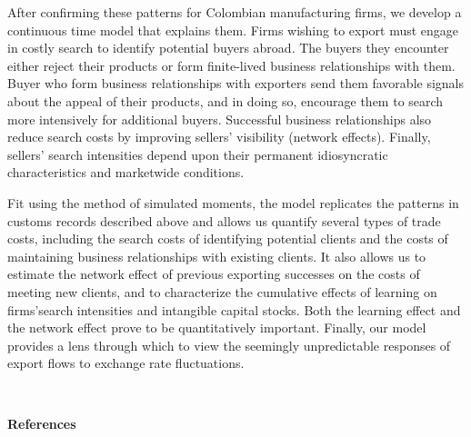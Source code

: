 \documentclass[12pt]{article}
\begin{document}
After confirming these patterns for Colombian manufacturing firms, we
develop a continuous time model that explains them. Firms wishing to export
must engage in costly search to identify potential buyers abroad. The buyers
they encounter either reject their products or form finite-lived business
relationships with them. Buyer who form business relationships with
exporters send them favorable signals about the appeal of their products,
and in doing so, encourage them to search more intensively for additional
buyers. Successful business relationships also reduce search costs by
improving sellers' visibility (network effects). Finally, sellers' search
intensities depend upon their permanent idiosyncratic characteristics and
marketwide conditions.

Fit using the method of simulated moments, the model replicates the patterns
in customs records described above and allows us quantify several types of
trade costs, including the search costs of identifying potential clients and
the costs of maintaining business relationships with existing clients. It
also allows us to estimate the network effect of previous exporting
successes on the costs of meeting new clients, and to characterize the
cumulative effects of learning on firms'search intensities and intangible
capital stocks. Both the learning effect and the network effect prove to be
quantitatively important. Finally, our model provides a lens through which
to view the seemingly unpredictable responses of export flows to exchange
rate fluctuations.

\begin{center}
\ \pagebreak

{\Large \textbf{References}}
\end{center}
\end{document}
